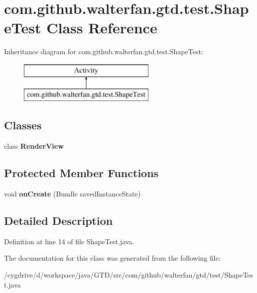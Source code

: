 \hypertarget{classcom_1_1github_1_1walterfan_1_1gtd_1_1test_1_1ShapeTest}{\section{com.\-github.\-walterfan.\-gtd.\-test.\-Shape\-Test Class Reference}
\label{classcom_1_1github_1_1walterfan_1_1gtd_1_1test_1_1ShapeTest}
}
Inheritance diagram for com.\-github.\-walterfan.\-gtd.\-test.\-Shape\-Test\-:\begin{figure}[H]
\begin{center}
\leavevmode
\includegraphics[height=2.000000cm]{classcom_1_1github_1_1walterfan_1_1gtd_1_1test_1_1ShapeTest}
\end{center}
\end{figure}
\subsection*{Classes}
\begin{DoxyCompactItemize}
\item 
class {\bfseries Render\-View}
\end{DoxyCompactItemize}
\subsection*{Protected Member Functions}
\begin{DoxyCompactItemize}
\item 
\hypertarget{classcom_1_1github_1_1walterfan_1_1gtd_1_1test_1_1ShapeTest_ae8f083098155dab718e3f9328e10d6dd}{void {\bfseries on\-Create} (Bundle saved\-Instance\-State)}\label{classcom_1_1github_1_1walterfan_1_1gtd_1_1test_1_1ShapeTest_ae8f083098155dab718e3f9328e10d6dd}

\end{DoxyCompactItemize}


\subsection{Detailed Description}


Definition at line 14 of file Shape\-Test.\-java.



The documentation for this class was generated from the following file\-:\begin{DoxyCompactItemize}
\item 
/cygdrive/d/workspace/java/\-G\-T\-D/src/com/github/walterfan/gtd/test/Shape\-Test.\-java\end{DoxyCompactItemize}
